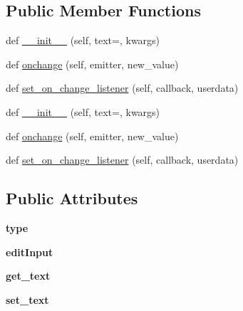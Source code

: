 \subsection*{Public Member Functions}
\begin{DoxyCompactItemize}
\item 
def \hyperlink{classremi_1_1gui_1_1TableEditableItem_a4a40c8cca94502c043db03c21695d869}{\+\_\+\+\_\+init\+\_\+\+\_\+} (self, text=\textquotesingle{}\textquotesingle{}, kwargs)
\item 
def \hyperlink{classremi_1_1gui_1_1TableEditableItem_a60bf01d297858ee28435312fcbcd1397}{onchange} (self, emitter, new\+\_\+value)
\item 
def \hyperlink{classremi_1_1gui_1_1TableEditableItem_ad590438db3cbe813cff27936e4c69253}{set\+\_\+on\+\_\+change\+\_\+listener} (self, callback, userdata)
\item 
def \hyperlink{classremi_1_1gui_1_1TableEditableItem_a4a40c8cca94502c043db03c21695d869}{\+\_\+\+\_\+init\+\_\+\+\_\+} (self, text=\textquotesingle{}\textquotesingle{}, kwargs)
\item 
def \hyperlink{classremi_1_1gui_1_1TableEditableItem_a60bf01d297858ee28435312fcbcd1397}{onchange} (self, emitter, new\+\_\+value)
\item 
def \hyperlink{classremi_1_1gui_1_1TableEditableItem_ad590438db3cbe813cff27936e4c69253}{set\+\_\+on\+\_\+change\+\_\+listener} (self, callback, userdata)
\end{DoxyCompactItemize}
\subsection*{Public Attributes}
\begin{DoxyCompactItemize}
\item 
{\bfseries type}\hypertarget{classremi_1_1gui_1_1TableEditableItem_a54bcec88025570e23b80e8b10e476d5a}{}\label{classremi_1_1gui_1_1TableEditableItem_a54bcec88025570e23b80e8b10e476d5a}

\item 
{\bfseries edit\+Input}\hypertarget{classremi_1_1gui_1_1TableEditableItem_a60909b4feb348eb22a1d082c94ee8f64}{}\label{classremi_1_1gui_1_1TableEditableItem_a60909b4feb348eb22a1d082c94ee8f64}

\item 
{\bfseries get\+\_\+text}\hypertarget{classremi_1_1gui_1_1TableEditableItem_a1c2fa75e9ba5485665b7a5ffb88a047a}{}\label{classremi_1_1gui_1_1TableEditableItem_a1c2fa75e9ba5485665b7a5ffb88a047a}

\item 
{\bfseries set\+\_\+text}\hypertarget{classremi_1_1gui_1_1TableEditableItem_aca4ccef176805e8797660284bb96873a}{}\label{classremi_1_1gui_1_1TableEditableItem_aca4ccef176805e8797660284bb96873a}

\end{DoxyCompactItemize}
